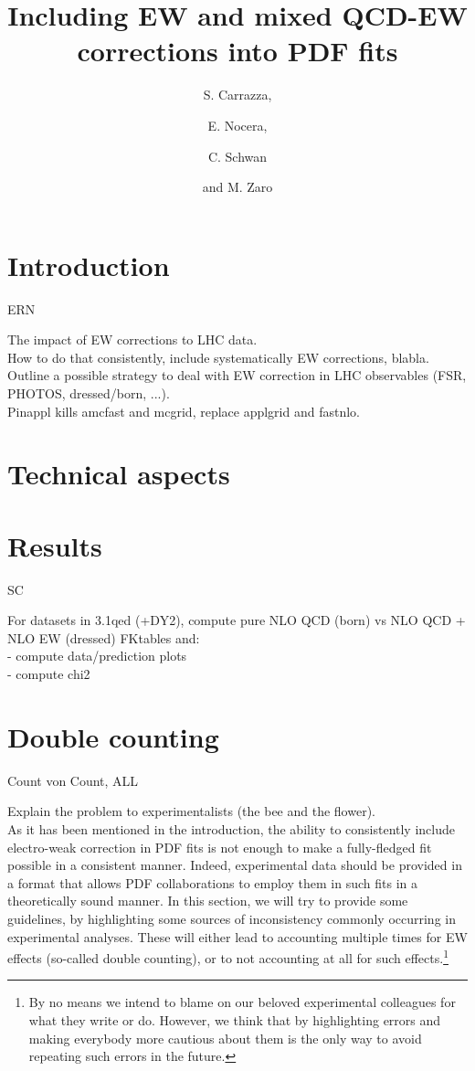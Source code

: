 \documentclass[a4paper,11pt]{article}
\title{Including EW and mixed QCD-EW corrections into PDF fits}
\author[a,b]{S. Carrazza,}
\author[b]{E. Nocera,}
\author[a]{C. Schwan}
\author[a,b]{and M. Zaro}
\affiliation[a]{Tif Lab, Dipartimento di Fisica, Universit\`a di Milano and INFN, Sezione di Milano, 20133 Milano, Italy}
\affiliation[b]{Nikhef Theory Group, Science Park 105, 1098 XG Amsterdam, The Netherlands}
\begin{document}
\maketitle
\flushbottom

\section{Introduction}
\label{sec:introduction}

ERN

The impact of EW corrections to LHC data.\\
How to do that consistently, include systematically EW corrections, blabla.\\
Outline a possible strategy to deal with EW correction in LHC observables (FSR, PHOTOS, dressed/born, ...).\\
Pinappl kills amcfast and mcgrid, replace applgrid and fastnlo.\\

\section{Technical aspects}
\label{sec:technical-aspects}



\section{Results}

SC

For datasets in 3.1qed (+DY2), compute pure NLO QCD (born) vs NLO QCD + NLO EW (dressed) FKtables and:\\
- compute data/prediction plots\\
- compute chi2\\

\section{Double counting}
Count von Count, ALL

Explain the problem to experimentalists (the bee and the flower).\\

As it has been mentioned in the introduction, the ability to consistently include electro-weak correction in
PDF fits is not enough to make a fully-fledged fit possible in a consistent manner. Indeed, experimental data should
be provided in  a format that allows PDF collaborations to employ them in such fits in a theoretically sound manner. In this
section, we will try to provide some guidelines, by highlighting some sources of inconsistency commonly occurring in experimental 
analyses. These will either lead to accounting multiple times for EW effects (so-called double counting), or to not accounting at
all for such effects.\footnote{By no means we intend to blame on our beloved experimental colleagues for what they write or do. However,
    we think that by highlighting errors and making everybody more cautious about them is the only way to avoid repeating such
    errors in the future.}
\end{document}
